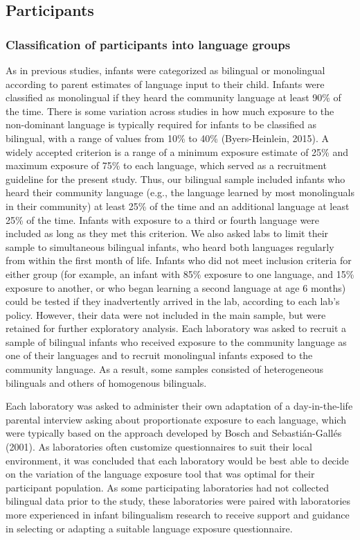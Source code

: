 \documentclass[
  english,
  ,man,floatsintext]{apa6}
\begin{document}
\hypertarget{participants}{%
\subsection{Participants}\label{participants}}

\hypertarget{classification-of-participants-into-language-groups}{%
\subsubsection{Classification of participants into language groups}\label{classification-of-participants-into-language-groups}}

As in previous studies, infants were categorized as bilingual or monolingual according to parent estimates of language input to their child. Infants were classified as monolingual if they heard the community language at least 90\% of the time. There is some variation across studies in how much exposure to the non-dominant language is typically required for infants to be classified as bilingual, with a range of values from 10\% to 40\% (Byers-Heinlein, 2015). A widely accepted criterion is a range of a minimum exposure estimate of 25\% and maximum exposure of 75\% to each language, which served as a recruitment guideline for the present study. Thus, our bilingual sample included infants who heard their community language (e.g., the language learned by most monolinguals in their community) at least 25\% of the time and an additional language at least 25\% of the time. Infants with exposure to a third or fourth language were included as long as they met this criterion. We also asked labs to limit their sample to simultaneous bilingual infants, who heard both languages regularly from within the first month of life. Infants who did not meet inclusion criteria for either group (for example, an infant with 85\% exposure to one language, and 15\% exposure to another, or who began learning a second language at age 6 months) could be tested if they inadvertently arrived in the lab, according to each lab's policy. However, their data were not included in the main sample, but were retained for further exploratory analysis. Each laboratory was asked to recruit a sample of bilingual infants who received exposure to the community language as one of their languages and to recruit monolingual infants exposed to the community language. As a result, some samples consisted of heterogeneous bilinguals and others of homogenous bilinguals.

Each laboratory was asked to administer their own adaptation of a day-in-the-life parental interview asking about proportionate exposure to each language, which were typically based on the approach developed by Bosch and Sebastián-Gallés (2001). As laboratories often customize questionnaires to suit their local environment, it was concluded that each laboratory would be best able to decide on the variation of the language exposure tool that was optimal for their participant population. As some participating laboratories had not collected bilingual data prior to the study, these laboratories were paired with laboratories more experienced in infant bilingualism research to receive support and guidance in selecting or adapting a suitable language exposure questionnaire.
\end{document}
